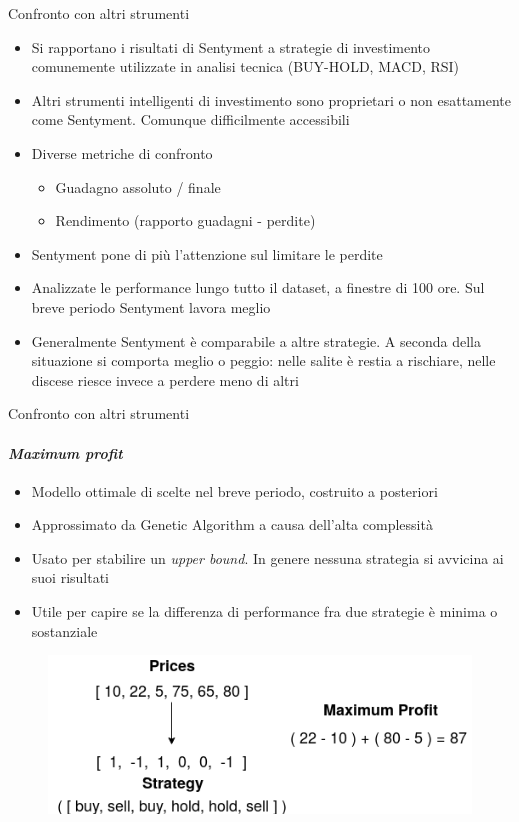 \documentclass{beamer}
\begin{document}
\begin{frame}{Confronto con altri strumenti}
\begin{itemize}
\item Si rapportano i risultati di Sentyment a strategie di investimento comunemente utilizzate in analisi tecnica (BUY-HOLD, MACD, RSI)
\item Altri strumenti intelligenti di investimento sono proprietari o non esattamente come Sentyment. Comunque difficilmente accessibili
\item Diverse metriche di confronto
\begin{itemize}
\item Guadagno assoluto / finale
\item Rendimento (rapporto guadagni - perdite)
\end{itemize}
\item Sentyment pone di più l'attenzione sul limitare le perdite
\item Analizzate le performance lungo tutto il dataset, a finestre di 100 ore. Sul breve periodo Sentyment lavora meglio
\item Generalmente Sentyment è comparabile a altre strategie. A seconda della situazione si comporta meglio o peggio: nelle salite è restia a rischiare, nelle discese riesce invece a perdere meno di altri  
\end{itemize}
\end{frame}

\begin{frame}{Confronto con altri strumenti}
\framesubtitle{\textit{Maximum profit}}
\begin{itemize}
\item Modello ottimale di scelte nel breve periodo, costruito a posteriori
\item Approssimato da Genetic Algorithm a causa dell'alta complessità
\item Usato per stabilire un \textit{upper bound}. In genere nessuna strategia si avvicina ai suoi risultati
\item Utile per capire se la differenza di performance fra due strategie è minima o sostanziale
\end{itemize}
\begin{figure}
        \centering
        \includegraphics[width=.5\linewidth]{maxprof}
\end{figure}
\end{frame}
\end{document}
